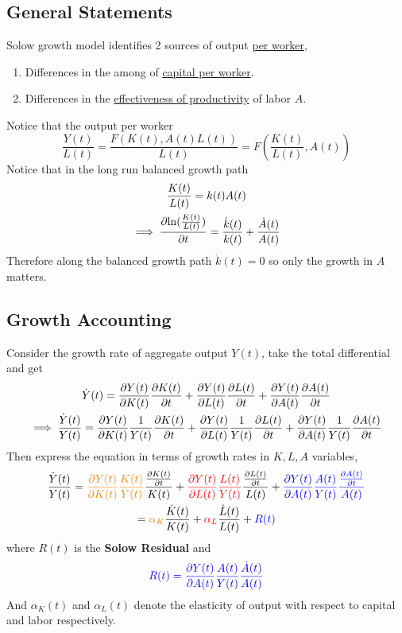 \documentclass[]{article}
\begin{document}
	    \subsection{General Statements}
	    \par Solow growth model identifies 2 sources of output \ul{per worker},
	    \begin{enumerate}
	    	\item Differences in the among of \ul{capital per worker}.
	    	\item Differences in the \ul{effectiveness of productivity} of labor $A$.
	    \end{enumerate}
	    Notice that the output per worker 
	    \[
	    	\frac{Y(t)}{L(t)} = \frac{F(K(t), A(t)L(t))}{L(t)} = F(\frac{K(t)}{L(t)}, A(t))
	    \]
	    Notice that in the long run balanced growth path
	    \begin{gather*}
	    	\frac{K(t)}{L(t)} = k(t)A(t) \\
	    	\implies \frac{\partial{\ln(\frac{K(t)}{L(t)})}}{\partial{t}} = \frac{\dot{k}(t)}{k(t)} + \frac{\dot{A}(t)}{A(t)}
	    \end{gather*}
	    Therefore along the balanced growth path $\dot{k}(t) = 0$ so only the growth in $A$ matters.
	    
	    \subsection{Growth Accounting}
	    \par Consider the growth rate of aggregate output $Y(t)$, take the total differential and get
	    \begin{gather}
	    	\dot{Y}(t) = \frac{\partial{Y(t)}}{\partial{K(t)}} \frac{\partial{K(t)}}{\partial{t}} + \frac{\partial{Y(t)}}{\partial{L(t)}} \frac{\partial{L(t)}}{\partial{t}} + \frac{\partial{Y(t)}}{\partial{A(t	)}}\frac{\partial{A(t)}}{\partial{t}} \\
	    	\implies 
	    	\frac{\dot{Y}(t)}{Y(t)} = \frac{\partial{Y(t)}}{\partial{K(t)}} \frac{1}{Y(t)} \frac{\partial{K(t)}}{\partial{t}} + \frac{\partial{Y(t)}}{\partial{L(t)}} \frac{1}{Y(t)} \frac{\partial{L(t)}}{\partial{t}} + \frac{\partial{Y(t)}}{\partial{A(t)}} \frac{1}{Y(t)} \frac{\partial{A(t)}}{\partial{t}} 
	    \end{gather}
	    Then express the equation in terms of growth rates in $K, L, A$ variables,
	    \begin{gather}
	    	\frac{\dot{Y}(t)}{Y(t)} = \textcolor{orange}{\frac{\partial{Y(t)}}{\partial{K(t)}} \frac{K(t)}{Y(t)}}\frac{\frac{\partial{K(t)}}{\partial{t}}}{K(t)} 
	    	+ \textcolor{red}{\frac{\partial{Y(t)}}{\partial{L(t)}} \frac{L(t)}{Y(t)}} \frac{\frac{\partial{L(t)}}{\partial{t}}}{L(t)} 
	    	+ \textcolor{blue}{\frac{\partial{Y(t)}}{\partial{A(t)}} \frac{A(t)}{Y(t)} \frac{\frac{\partial{A(t)}}{\partial{t}}}{A(t)}}
	    	\\
	    	= \textcolor{orange}{\alpha_K} \frac{\dot{K}(t)}{K(t)} 
	    	+ \textcolor{red}{\alpha_L} \frac{\dot{L}(t)}{L(t)} 
	    	+ \textcolor{blue}{R(t)}
	    \end{gather}
	    where $R(t)$ is the \textbf{Solow Residual} and 
	    \begin{equation}
	    	\textcolor{blue}{R(t) = \frac{\partial{Y(t)}}{\partial{A(t)}} \frac{A(t)}{Y(t)} \frac{\dot{A}(t)}{A(t)}}
	    \end{equation}
	    And $\alpha_K(t)$ and $\alpha_L(t)$ denote the elasticity of output with respect to capital and labor respectively.
	    
\end{document}
